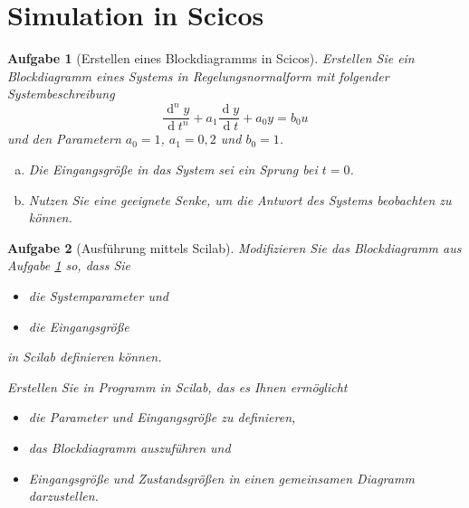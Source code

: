 \documentclass[11pt,a4paper,headsepline]{scrartcl}
\newtheorem{aufgabe}{Aufgabe}
\newcommand{\D}{\operatorname{d}}
\begin{document}
\section*{Simulation in Scicos}
\begin{aufgabe}[Erstellen eines Blockdiagramms in Scicos] 
\label{Task:BDScicos}
Erstellen Sie ein Blockdiagramm eines Systems in Regelungsnormalform mit folgender Systembeschreibung
\begin{equation*}
		\frac{\D^{n} y}{\D t^{n}} + a_{1} \frac{\D y}{\D t} + a_{0} y  
		= b_{0} u 
	\end{equation*}
	und den Parametern $a_{0} = 1$, $a_{1} = 0{,}2$ und $b_{0} = 1$.
	
	\begin{enumerate}[a)]
		\item Die Eingangsgr\"o{\ss}e in das System sei ein Sprung bei $t = 0$.
		\item Nutzen Sie eine geeignete Senke, um die Antwort des Systems beobachten zu k\"onnen.
	\end{enumerate}
\end{aufgabe}
\vspace{0.5cm}
\begin{aufgabe}[Ausf\"uhrung mittels Scilab]
\label{Task:Scilab}
Modifizieren Sie das Blockdiagramm aus Aufgabe \ref{Task:BDScicos} so, dass Sie
\begin{itemize}
		\item die Systemparameter und
		\item die Eingangsgr\"o{\ss}e
		\end{itemize}
in Scilab definieren k\"onnen. 

Erstellen Sie in Programm in Scilab, das es Ihnen erm\"oglicht
\begin{itemize}
		\item die Parameter und Eingangsgr\"o{\ss}e zu definieren,
		\item das Blockdiagramm auszuf\"uhren und
		\item Eingangsgr\"o{\ss}e und Zustandsgr\"o{\ss}en in einen gemeinsamen Diagramm darzustellen.
		\end{itemize}
\end{aufgabe}
\end{document}
